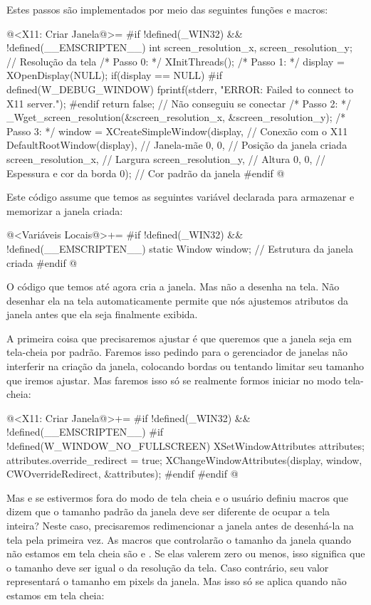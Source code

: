 Estes passos são implementados por meio das seguintes funções e
macros:

\iniciocodigo
@<X11: Criar Janela@>=
#if !defined(_WIN32) && !defined(__EMSCRIPTEN__)
int screen_resolution_x, screen_resolution_y; // Resolução da tela
/* Passo 0: */
XInitThreads();
/* Passo 1: */
display = XOpenDisplay(NULL);
if(display == NULL){
#if defined(W_DEBUG_WINDOW)
  fprintf(stderr, "ERROR: Failed to connect to X11 server.\n");
#endif
  return false; // Não conseguiu se conectar
}
/* Passo 2: */
_Wget_screen_resolution(&screen_resolution_x, &screen_resolution_y);
/* Passo 3: */
window = XCreateSimpleWindow(display, // Conexão com o X11
                             DefaultRootWindow(display), // Janela-mãe
                             0, 0, // Posição da janela criada
                             screen_resolution_x, // Largura
                             screen_resolution_y, // Altura
                             0, 0, // Espessura e cor da borda
                             0); // Cor padrão da janela
#endif
@
\fimcodigo

Este código assume que temos as seguintes variável declarada para
armazenar e memorizar a janela criada:

\iniciocodigo
@<Variáveis Locais@>+=
#if !defined(_WIN32) && !defined(__EMSCRIPTEN__)
static Window window;    // Estrutura da janela criada
#endif
@
\fimcodigo

O código que temos até agora cria a janela. Mas não a desenha na
tela. Não desenhar ela na tela automaticamente permite que nós
ajustemos atributos da janela antes que ela seja finalmente exibida.

A primeira coisa que precisaremos ajustar é que queremos que a janela
seja em tela-cheia por padrão. Faremos isso pedindo para o gerenciador
de janelas não interferir na criação da janela, colocando bordas ou
tentando limitar seu tamanho que iremos ajustar. Mas faremos isso só
se realmente formos iniciar no modo tela-cheia:

\iniciocodigo
@<X11: Criar Janela@>+=
#if !defined(_WIN32) && !defined(__EMSCRIPTEN__)
#if !defined(W_WINDOW_NO_FULLSCREEN)
{
  XSetWindowAttributes attributes;
  attributes.override_redirect = true;
  XChangeWindowAttributes(display, window, CWOverrideRedirect,
                          &attributes);
}
#endif
#endif
@
\fimcodigo

Mas e se estivermos fora do modo de tela cheia e o usuário definiu
macros que dizem que o tamanho padrão da janela deve ser diferente de
ocupar a tela inteira? Neste caso, precisaremos redimencionar a janela
antes de desenhá-la na tela pela primeira vez. As macros que
controlarão o tamanho da janela quando não estamos em tela cheia
são 
e . Se elas valerem zero ou
menos, isso significa que o tamanho deve ser igual o da resolução da
tela. Caso contrário, seu valor representará o tamanho em pixels da
janela. Mas isso só se aplica quando não estamos em tela cheia:

